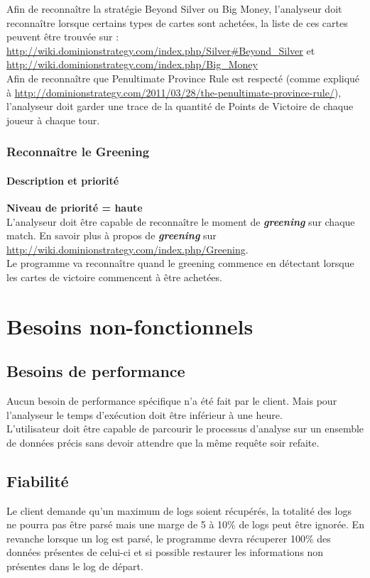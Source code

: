 Afin de reconnaître la stratégie Beyond Silver ou Big Money, l'analyseur doit reconnaître lorsque certains types de cartes sont achetées, la liste de ces cartes peuvent être trouvée sur : \url{http://wiki.dominionstrategy.com/index.php/Silver#Beyond_Silver} et \url{http://wiki.dominionstrategy.com/index.php/Big_Money}\\

Afin de reconnaître que Penultimate Province Rule est respecté (comme expliqué à \url{http://dominionstrategy.com/2011/03/28/the-penultimate-province-rule/}), l’analyseur doit garder une trace de la quantité de Points de Victoire de chaque joueur à chaque tour.

\subsubsection{Reconnaître le Greening}
\paragraph*{Description et priorité}
\textbf{Niveau de priorité = haute}\\

L'analyseur doit être capable de reconnaître le moment de \textit{\textbf{greening}} sur chaque match.
En savoir plus à propos de \textit{\textbf{greening}} sur \url{http://wiki.dominionstrategy.com/index.php/Greening}.\\
Le programme va reconnaître quand le greening commence en détectant lorsque les cartes de victoire commencent à être achetées.

\newpage

\section{Besoins non-fonctionnels}

\subsection{Besoins de performance}

Aucun besoin de performance spécifique n’a été fait par le client. Mais pour l'analyseur le temps d’exécution  doit être inférieur à une heure.\\
L'utilisateur doit être capable de parcourir le processus d'analyse sur un ensemble de données précis sans devoir attendre que la même requête soir refaite.

\subsection{Fiabilité}
Le client demande qu'un maximum de logs soient récupérés, la totalité des logs ne pourra pas être parsé mais une marge de 5 à 10\% de logs peut être ignorée.\newline
En revanche lorsque un log est parsé, le programme devra récuperer 100\% des données présentes de celui-ci et si possible restaurer les informations non présentes dans le log de départ.

